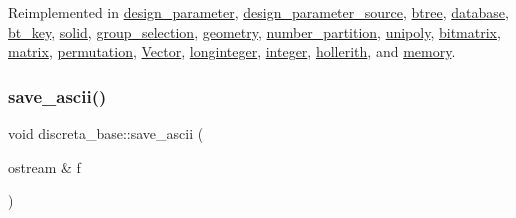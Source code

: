 Reimplemented in \mbox{\hyperlink{classdesign__parameter_af41eca1f66a8113dd0b892b26d791028}{design\+\_\+parameter}}, \mbox{\hyperlink{classdesign__parameter__source_ad3ee1c1d1dfa39a6eb3e2ee538b0e350}{design\+\_\+parameter\+\_\+source}}, \mbox{\hyperlink{classbtree_afffc3582b6eda450238f4cb268e79ef3}{btree}}, \mbox{\hyperlink{classdatabase_a30a79d9d1ae22f160368de28625ddeba}{database}}, \mbox{\hyperlink{classbt__key_a53b7441523674e20f5c8f5c81eaccad4}{bt\+\_\+key}}, \mbox{\hyperlink{classsolid_aae18938e9f7d9784734fe72e8d3223a7}{solid}}, \mbox{\hyperlink{classgroup__selection_a21d7be997a2787d8a1284696b01038e8}{group\+\_\+selection}}, \mbox{\hyperlink{classgeometry_a289c387cc78ff0f0379646cded7648f4}{geometry}}, \mbox{\hyperlink{classnumber__partition_aaa88b590321ba25867fb1c70451c629a}{number\+\_\+partition}}, \mbox{\hyperlink{classunipoly_a62303d2461523c791edc16fe40371e18}{unipoly}}, \mbox{\hyperlink{classbitmatrix_a3e8982cdd7e500a0298a60469b4a5860}{bitmatrix}}, \mbox{\hyperlink{classmatrix_a4880cc2b5e8d3f8f2d8038580364db56}{matrix}}, \mbox{\hyperlink{classpermutation_a2840be30bd1e636da5a955973c0c70b8}{permutation}}, \mbox{\hyperlink{class_vector_a20550e70d02cbe484032c7f6b0833a0f}{Vector}}, \mbox{\hyperlink{classlonginteger_ab5c97c64a923bc2bd270c998d1d2f283}{longinteger}}, \mbox{\hyperlink{classinteger_a183985f67ef55beed80bda05a0c574d9}{integer}}, \mbox{\hyperlink{classhollerith_a868bba1481a52276f83e18e3b4280b31}{hollerith}}, and \mbox{\hyperlink{classmemory_a75dd039fc284723f284b9a62a199f623}{memory}}.

\mbox{\label{classdiscreta__base_a20b88cb86e90c53a6046843396c171b1}} 
\subsubsection{\texorpdfstring{save\+\_\+ascii()}{save\_ascii()}}
{\footnotesize\ttfamily void discreta\+\_\+base\+::save\+\_\+ascii (\begin{DoxyParamCaption}\item[{ostream \&}]{f }\end{DoxyParamCaption})}

\mbox{\label{classdiscreta__base_a17630e7267e0a73778a3b544f4ebdd11}} 

